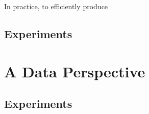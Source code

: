 In practice, to efficiently produce 

\subsection{Experiments}

\section{A Data Perspective}
\label{sec:data}

\subsection{}

\subsection{Experiments}
